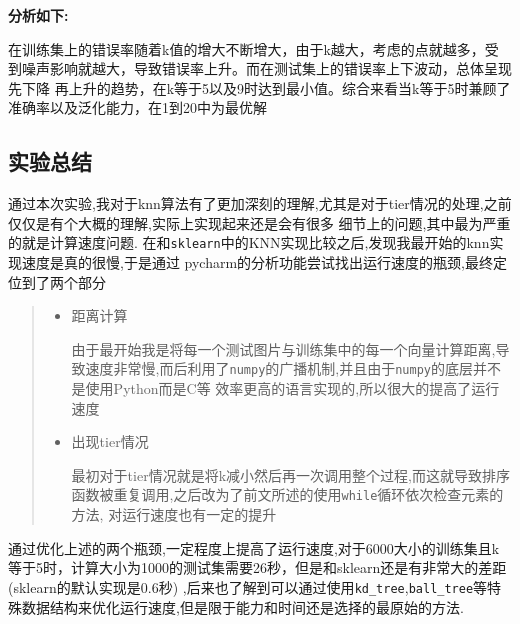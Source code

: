 \documentclass[UTF8]{ctexart}
\begin{document}
\textbf{分析如下:}

在训练集上的错误率随着k值的增大不断增大，由于k越大，考虑的点就越多，受到噪声影响就越大，导致错误率上升。而在测试集上的错误率上下波动，总体呈现先下降
再上升的趋势，在k等于5以及9时达到最小值。综合来看当k等于5时兼顾了准确率以及泛化能力，在1到20中为最优解

\subsection{实验总结}
通过本次实验,我对于knn算法有了更加深刻的理解,尤其是对于tier情况的处理,之前仅仅是有个大概的理解,实际上实现起来还是会有很多
细节上的问题,其中最为严重的就是计算速度问题. 在和\lstinline{sklearn}中的KNN实现比较之后,发现我最开始的knn实现速度是真的很慢,于是通过
pycharm的分析功能尝试找出运行速度的瓶颈,最终定位到了两个部分
\begin{quote}
    \begin{itemize}
        \item 距离计算

        由于最开始我是将每一个测试图片与训练集中的每一个向量计算距离,导致速度非常慢,而后利用了\lstinline{numpy}的广播机制,并且由于\lstinline{numpy}的底层并不是使用Python而是C等
        效率更高的语言实现的,所以很大的提高了运行速度
        \item 出现tier情况

        最初对于tier情况就是将k减小然后再一次调用整个过程,而这就导致排序函数被重复调用,之后改为了前文所述的使用\lstinline{while}循环依次检查元素的方法,
        对运行速度也有一定的提升
    \end{itemize}
\end{quote}
通过优化上述的两个瓶颈,一定程度上提高了运行速度,对于6000大小的训练集且k等于5时，计算大小为1000的测试集需要26秒，但是和sklearn还是有非常大的差距(sklearn的默认实现是0.6秒)
,后来也了解到可以通过使用\lstinline{kd_tree},\lstinline{ball_tree}等特殊数据结构来优化运行速度,但是限于能力和时间还是选择的最原始的方法.
\end{document}
